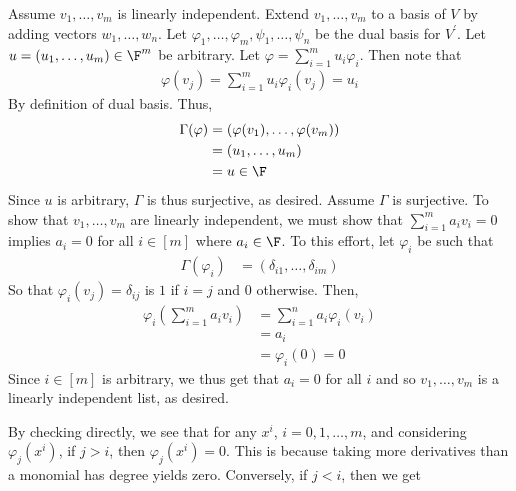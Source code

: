 \documentclass{book}
\begin{document}
\begin{enumerate}[label=\arabic*)]
\begin{enumerate}[label=\alph*)]
\begin{enumerate}[label=\roman*)]
            \ii 
              Assume $v_1, \dots, v_m$ is linearly independent. Extend $v_1, \dots, v_m$ to a basis of $V$ by adding vectors $w_1, \dots, w_n$. Let $\varphi_1, \dots, \varphi_m, \psi_1,
              \dots, \psi_n$ be the dual basis for $V^{\prime}$. Let $u = (u_1, \dots, u_m) \in \F^m$ be arbitrary. Let $\varphi = \sum_{i = 1}^{m}u_i\varphi_i$. Then note that
              \begin{align*}
                \varphi(v_j) = \sum_{i = 1}^{m}u_i\varphi_i(v_j) = u_i
              \end{align*}
              By definition of dual basis. Thus,
              \begin{align*}
                \Gamma(\varphi) & = \left( \varphi(v_1), \dots, \varphi(v_m) \right) \\
                & = (u_1, \dots, u_m) \\
                & = u \in \F
              \end{align*}
              Since $u$ is arbitrary, $\Gamma$ is thus surjective, as desired.
            \ii 
              Assume $\Gamma$ is surjective. To show that $v_1, \dots, v_m$ are linearly independent, we must show that $\sum_{i = 1}^{m}a_iv_i = 0$ implies $a_i = 0$ for all $i \in [m]$ where
              $a_i \in \F$. To this effort, let $\varphi_i$ be such that
              \begin{align*}
                \Gamma(\varphi_i) & = \left( \delta_{i1}, \dots, \delta_{im} \right)
              \end{align*}
              So that $\varphi_i(v_j) = \delta_{ij}$ is $1$ if $i = j$ and $0$ otherwise. Then,
              \begin{align*}
                \varphi_i(\sum_{i = 1}^{m}a_iv_i) & = \sum_{i = 1}^{n}a_i\varphi_i(v_i) \\
                & = a_i \\
                & = \varphi_i(0) = 0
              \end{align*}
              Since $i \in [m]$ is arbitrary, we thus get that $a_i = 0$ for all $i$ and so $v_1, \dots, v_m$ is a linearly independent list, as desired.
          \end{enumerate}
      \end{enumerate}
    \ii
      By checking directly, we see that for any $x^i$, $i = 0, 1, \dots, m$, and considering $\varphi_j(x^i)$, if $j > i$, then $\varphi_j(x^i) = 0$. This is because taking more derivatives
      than a monomial has degree yields zero. Conversely, if $j < i$, then we get 

\end{enumerate}
\end{document}
